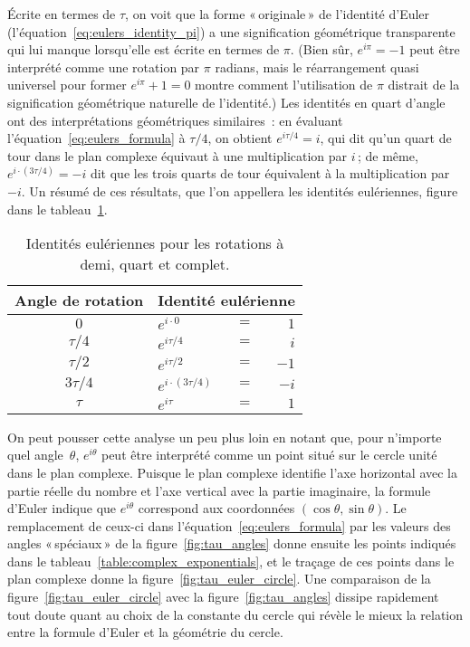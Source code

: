 Écrite en termes de $\tau$, on voit que la forme «\,originale\,» de l'identité
d'Euler (l'équation~\eqref{eq:eulers_identity_pi}) a une signification
géométrique transparente qui lui manque lorsqu'elle est écrite en termes de
$\pi$. (Bien sûr, $e^{i\pi} = -1$ peut être interprété comme une rotation par
$\pi$ radians, mais le réarrangement quasi universel pour former $e^{i\pi} + 1 =
0$ montre comment l'utilisation de $\pi$ distrait de la signification
géométrique naturelle de l'identité.) Les identités en quart d'angle ont des
interprétations géométriques similaires~: en évaluant
l'équation~\eqref{eq:eulers_formula} à $\tau/4$, on obtient $e^{i\tau/4} = i$,
qui dit qu'un quart de tour dans le plan complexe équivaut à une multiplication
par $i$\,; de même, $e^{i\cdot(3\tau/4)} = -i$ dit que les trois quarts de tour
équivalent à la multiplication par $-i$. Un résumé de ces résultats, que l'on
appellera les identités eulériennes, figure dans le
tableau~\ref{table:eulerian_identities}.

\begin{table}
\begin{center}
\begin{tabular}{cllr}
Angle de rotation & \multicolumn{3}{c}{Identité eulérienne} \\ \hline
$0$ & $e^{i\cdot0}$ & $ = $ & $1$ \smallskip \\
$\tau/4$ & $e^{i\tau/4}$ & $ = $ & $i$ \smallskip \\
$\tau/2$ & $e^{i\tau/2}$ & $ = $ & $-1$ \smallskip \\
$3\tau/4$ & $e^{i\cdot(3\tau/4)}$ & $ = $ & $-i$ \smallskip \\
$\tau$ & $e^{i\tau}$ & $ = $ & $1$
\end{tabular}
\end{center}
\caption{Identités eulériennes pour les rotations à demi, quart et
complet.\label{table:eulerian_identities}}
\end{table}

On peut pousser cette analyse un peu plus loin en notant que, pour n'importe
quel angle~$\theta$, $e^{i\theta}$ peut être interprété comme un point situé sur
le cercle unité dans le plan complexe. Puisque le plan complexe identifie l'axe
horizontal avec la partie réelle du nombre et l'axe vertical avec la partie
imaginaire, la formule d'Euler indique que $e^{i\theta}$ correspond aux
coordonnées $(\cos\theta,\sin\theta)$. Le remplacement de ceux-ci dans
l'équation~\eqref{eq:eulers_formula} par les valeurs des angles «\,spéciaux\,»
de la figure~\ref{fig:tau_angles} donne ensuite les points indiqués dans le
tableau~\ref{table:complex_exponentials}, et le traçage de ces points dans le
plan complexe donne la figure~\ref{fig:tau_euler_circle}. Une comparaison de la
figure~\ref{fig:tau_euler_circle} avec la figure~\ref{fig:tau_angles} dissipe
rapidement tout doute quant au choix de la constante du cercle qui révèle le
mieux la relation entre la formule d'Euler et la géométrie du cercle.

